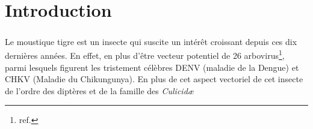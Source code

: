 \chapter{Introduction}

\paragraph{}

Le moustique tigre  est un insecte qui suscite un intérêt croissant depuis ces dix dernières années.
En effet, en plus d'être vecteur potentiel de 26 arbovirus\footnote{ref.}, parmi lesquels figurent les tristement célèbres DENV (maladie de la Dengue) et CHKV (Maladie du Chikungunya).
En plus de cet aspect vectoriel de cet insecte de l'ordre des diptères et de la famille des \textit{Culicidæ}